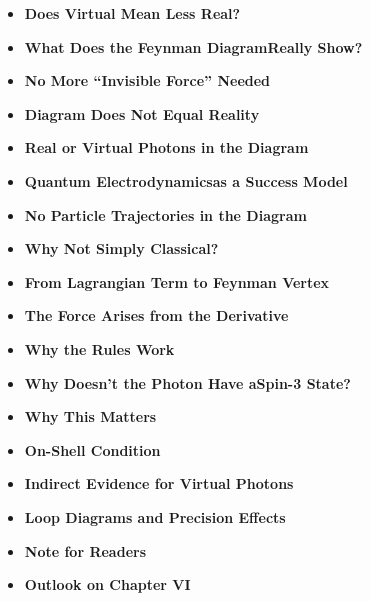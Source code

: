 \vspace{1em}
\begin{tcolorbox}[title=Didactic Boxes, didaktikbox]
	\begin{itemize}
		\item \textbf{Does Virtual Mean Less Real?} \dotfill \pageref{box:virtuell-denkfehler}
		\item \textbf{What Does the Feynman Diagram\newline Really Show?} \dotfill \pageref{box:Was zeigt das Feynman-Diagramm wirklich}
		\item \textbf{No More “Invisible Force” Needed} \dotfill \pageref{box:unsichtbare Kraft}
		\item \textbf{Diagram Does Not Equal Reality} \dotfill \pageref{boxx:Diagramm ist nicht gleich realität}
		\item \textbf{Real or Virtual Photons in the Diagram} \dotfill \pageref{box:Reale oder virtuelle Photonen}
		\item \textbf{Quantum Electrodynamics\newline as a Success Model} \dotfill \pageref{box:Die Quantenelekrodynamik}
		\item \textbf{No Particle Trajectories in the Diagram} \dotfill \pageref{box: Keine Teilchenbahn im Diagramm}
		\item \textbf{Why Not Simply Classical?} \dotfill \pageref{box:Warum nicht einfach klassisch?}
		\item \textbf{From Lagrangian Term to Feynman Vertex} \dotfill \pageref{box:Vom Lagrange-Term zum Feynmann-Vertax}
		\item \textbf{The Force Arises from the Derivative} \dotfill \pageref{box:Die Kraft entsteht aus dem Ableiter}
		\item \textbf{Why the Rules Work} \dotfill \pageref{box:Warum die Regeln funktionieren}
		\item \textbf{Why Doesn’t the Photon Have a\newline Spin-3 State?} \dotfill \pageref{box:Warum hat das Photon keinen  Spin-3-Zustand}
		\item \textbf{Why This Matters} \dotfill \pageref{box:Warum ist wichtig}
	\end{itemize}
\end{tcolorbox}

\vspace{1em}
\begin{tcolorbox}[title=Reference Boxes, hinweisbox]
	\begin{itemize}
		\item \textbf{On-Shell Condition} \dotfill \pageref{box:On-shell-Bedingung}
		\item \textbf{Indirect Evidence for Virtual Photons} \dotfill \pageref{box:Nachweis virtueller Photonen}
		\item \textbf{Loop Diagrams and Precision Effects} \dotfill \pageref{box:Schleifendiagramme}
		\item \textbf{Note for Readers} \dotfill \pageref{box:Hinweis füe Leser}
		\item \textbf{Outlook on Chapter VI} \dotfill \pageref{box:Ausblick auf Kapitel 6}
	\end{itemize}
\end{tcolorbox}

